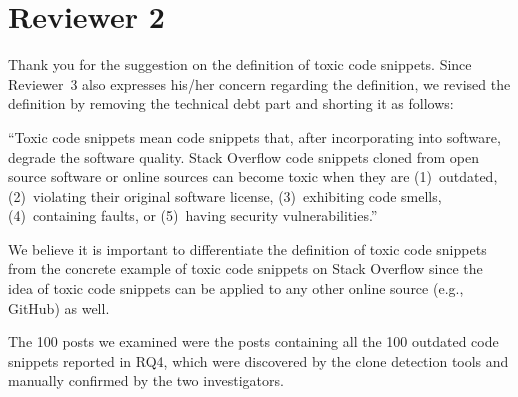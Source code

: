 \documentclass[a4paper,twoside,10pt]{reviewresponse}
\begin{document}
\section{Reviewer 2}


Thank you for the suggestion on the definition of toxic code snippets. Since Reviewer~3 also expresses his/her concern regarding the definition, we revised the definition by removing the technical debt part and shorting it as follows:

``Toxic code snippets mean code snippets that, after incorporating into software, degrade the software quality.
Stack Overflow code snippets
cloned from open source software or online sources can become toxic when they
are (1)~outdated, (2)~violating their original software
license, (3)~exhibiting code smells, (4)~containing faults, or (5)~having security vulnerabilities.''

We believe it is important to differentiate the definition of toxic code snippets from the concrete example of toxic code snippets on Stack Overflow since the idea of toxic code snippets can be applied to any other online source (e.g., GitHub) as well.


The 100 posts we examined were the posts containing all the 100 outdated code snippets reported in RQ4, which were discovered by the clone detection tools and manually confirmed by the two investigators.

\end{document}
